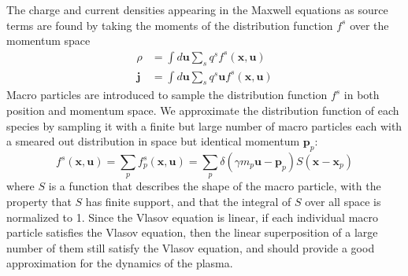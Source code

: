 The charge and current densities appearing in the Maxwell equations as source
terms are found by taking the moments of the distribution function $f^s$ over
the momentum space
\begin{align}
  \rho &= \int d \mathbf{u} \sum_s q^s f^s(\mathbf{x}, \mathbf{u}) \label{eqn:pic-rho} \\
  \mathbf{j} &= \int d \mathbf{u} \sum_s q^s \mathbf{u} f^s(\mathbf{x}, \mathbf{u}) \label{eqn:pic-j}
\end{align}
Macro particles are introduced to sample the distribution function $f^s$ in both
position and momentum space. We approximate the distribution function of each
species by sampling it with a finite but large number of macro particles each
with a smeared out distribution in space but identical momentum
$\mathbf{p}_{p}$:
\begin{equation}
    \label{eq:single-particle}
    f^s(\mathbf{x}, \mathbf{u}) = \sum_{p}f^s_{p}(\mathbf{x}, \mathbf{u}) = \sum_{p}\delta(\gamma m_{p}\mathbf{u} - \mathbf{p}_{p}) S(\mathbf{x} - \mathbf{x}_{p})
\end{equation}
where $S$ is a function that describes the shape of the macro particle, with the
property that $S$ has finite support, and that the integral of $S$ over all
space is normalized to 1. Since the Vlasov equation is linear, if each
individual macro particle satisfies the Vlasov equation, then the linear
superposition of a large number of them still satisfy the Vlasov equation, and
should provide a good approximation for the dynamics of the plasma.

